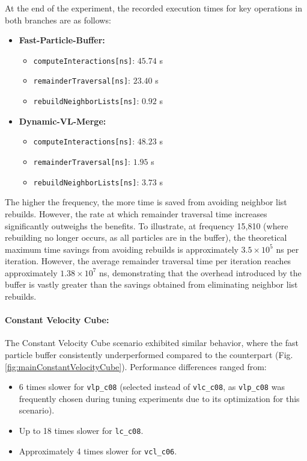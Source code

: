 At the end of the experiment, the recorded execution times for key operations in both branches are as follows:

\begin{itemize}
    \item \textbf{Fast-Particle-Buffer:}
    \begin{itemize}
        \item \texttt{computeInteractions[ns]}: $45.74$ s
        \item \texttt{remainderTraversal[ns]}: $23.40$ s
        \item \texttt{rebuildNeighborLists[ns]}: $0.92$ s
    \end{itemize}
    \item \textbf{Dynamic-VL-Merge:}
    \begin{itemize}
        \item \texttt{computeInteractions[ns]}: $48.23$ s
        \item \texttt{remainderTraversal[ns]}: $1.95$ s
        \item \texttt{rebuildNeighborLists[ns]}: $3.73$ s
    \end{itemize}
\end{itemize}

The higher the frequency, the more time is saved from avoiding neighbor list rebuilds. However, the rate at which remainder traversal time increases significantly outweighs the benefits. To illustrate, at frequency 15,810 (where rebuilding no longer occurs, as all particles are in the buffer), the theoretical maximum time savings from avoiding rebuilds is approximately $3.5 \times 10^5$ ns per iteration. However, the average remainder traversal time per iteration reaches approximately $1.38 \times 10^7$ ns, demonstrating that the overhead introduced by the buffer is vastly greater than the savings obtained from eliminating neighbor list rebuilds.

\paragraph{Constant Velocity Cube:}

The Constant Velocity Cube scenario exhibited similar behavior, where the fast particle buffer consistently underperformed compared to the counterpart (Fig. \ref{fig:mainConstantVelocityCube}). Performance differences ranged from:
\begin{itemize}
    \item 6 times slower for \texttt{vlp\_c08} (selected instead of \texttt{vlc\_c08}, as \texttt{vlp\_c08} was frequently chosen during tuning experiments due to its optimization for this scenario).
    \item Up to 18 times slower for \texttt{lc\_c08}.
    \item Approximately 4 times slower for \texttt{vcl\_c06}.
\end{itemize}

